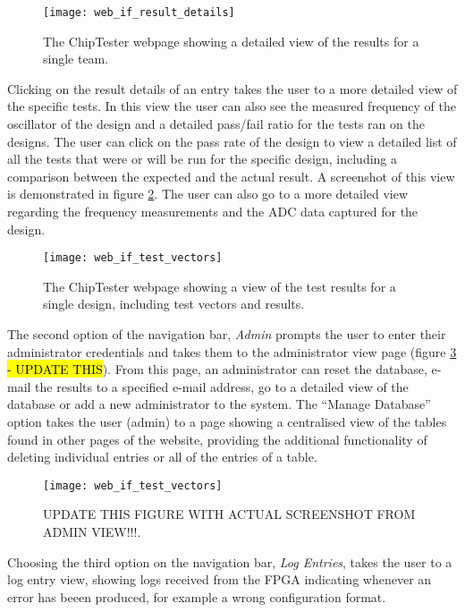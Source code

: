\begin{figure}[ht]
 \centering
 \texttt{[image: web\_if\_result\_details]}
 \caption{The ChipTester webpage showing a detailed view of the results for a single team.}
 \label{fig:web_if_result_details}
\end{figure}

Clicking on the result details of an entry takes the user to a more detailed view of the specific tests. In this view the user can also see the measured frequency of the oscillator of the design and a detailed pass/fail ratio for the tests ran on the designs. The user can click on the pass rate of the design to view a detailed list of all the tests that were or will be run for the specific design, including a comparison between the expected and the actual result. A screenshot of this view is demonstrated in figure \ref{fig:web_if_test_vectors}. The user can also go to a more detailed view regarding the frequency measurements and the ADC data captured for the design.

\begin{figure}[ht]
 \centering
 \texttt{[image: web\_if\_test\_vectors]}
 \caption{The ChipTester webpage showing a view of the test results for a single design, including test vectors and results.}
 \label{fig:web_if_test_vectors}
\end{figure}

The second option of the navigation bar, \textit{Admin} prompts the user to enter their administrator credentials and takes them to the administrator view page (figure \ref{fig:web_if_admin}\hl{ - UPDATE THIS}). From this page, an administrator can reset the database, e-mail the results to a specified e-mail address, go to a detailed view of the database or add a new administrator to the system. The ``Manage Database'' option takes the user (admin) to a page showing a centralised view of the tables found in other pages of the website, providing the additional functionality of deleting individual entries or all of the entries of a table.

\begin{figure}[ht]
 \centering
 \texttt{[image: web\_if\_test\_vectors]}
 \caption{UPDATE THIS FIGURE WITH ACTUAL SCREENSHOT FROM ADMIN VIEW!!!.}
 \label{fig:web_if_admin}
\end{figure}

Choosing the third option on the navigation bar, \textit{Log Entries}, takes the user to a log entry view, showing logs received from the FPGA indicating whenever an error has beeen produced, for example a wrong configuration format.

